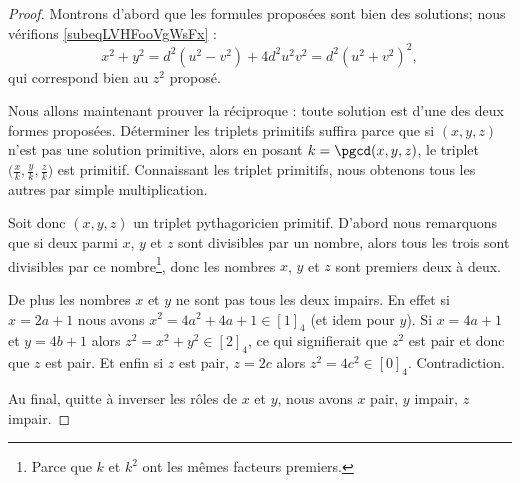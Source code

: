 \begin{proof}
    Montrons d'abord que les formules proposées sont bien des solutions; nous vérifions \eqref{subeqLVHFooVgWsFx} :
    \begin{equation}
        x^2+y^2=d^2(u^2-v^2)+4d^2u^2v^2=d^2(u^2+v^2)^2,
    \end{equation}
    qui correspond bien au \( z^2\) proposé.

    Nous allons maintenant prouver la réciproque : toute solution est d'une des deux formes proposées. Déterminer les triplets primitifs suffira parce que si \( (x,y,z)\) n'est pas une solution primitive, alors en posant \( k=\pgcd(x,y,z)\), le triplet \( \big( \frac{ x }{ k },\frac{ y }{ k },\frac{ z }{ k } \big)\) est primitif. Connaissant les triplet primitifs, nous obtenons tous les autres par simple multiplication.

    Soit donc \( (x,y,z)\) un triplet pythagoricien primitif. D'abord nous remarquons que si deux parmi \( x\), \( y\) et \( z\) sont divisibles par un nombre, alors tous les trois sont divisibles par ce nombre\footnote{Parce que \( k\) et \( k^2\) ont les mêmes facteurs premiers.}, donc les nombres \( x\), \( y\) et \( z\) sont premiers deux à deux.

    De plus les nombres \( x\) et \( y\) ne sont pas tous les deux impairs. En effet si \( x=2a+1\) nous avons \( x^2=4a^2+4a+1\in [1]_4\) (et idem pour \( y\)). Si \( x=4a+1\) et \( y=4b+1\) alors \( z^2=x^2+y^2\in [2]_4\), ce qui signifierait que \( z^2\) est pair et donc que \( z\) est pair. Et enfin si \( z\) est pair, \( z=2c\) alors \( z^2=4c^2\in [0]_4\). Contradiction. 

    Au final, quitte à inverser les rôles de \( x\) et \( y\), nous avons \( x\) pair, \( y\) impair, \( z\) impair.


\end{proof}
